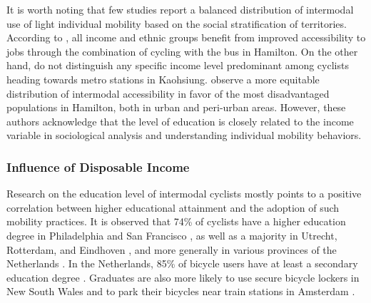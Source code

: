 \begin{refsegment}
It is worth noting that few studies report a balanced distribution of intermodal use of light individual mobility based on the social stratification of territories. According to \textcolor{blue}{\textcite[10]{zuo_first-and-last_2020}}, all income and ethnic groups benefit from improved accessibility to jobs through the combination of cycling with the bus in Hamilton. On the other hand, \textcolor{blue}{\textcite[1696]{cheng_evaluating_2012}} do not distinguish any specific income level predominant among cyclists heading towards metro stations in Kaohsiung. \textcolor{blue}{\textcite[86]{zuo_incorporating_2021}} observe a more equitable distribution of intermodal accessibility in favor of the most disadvantaged populations in Hamilton, both in urban and peri-urban areas. However, these authors acknowledge that the level of education is closely related to the income variable in sociological analysis and understanding individual mobility behaviors.%

\subsubsection*{Influence of Disposable Income
    \label{chap2:revenus}
    }

Research on the education level of intermodal cyclists mostly points to a positive correlation between higher educational attainment and the adoption of such mobility practices. It is observed that 74\% of cyclists have a higher education degree in Philadelphia and San Francisco \textcolor{blue}{\autocite[103]{flamm_public_2014}}, as well as a majority in Utrecht, Rotterdam, and Eindhoven \textcolor{blue}{\autocite[11]{jonkeren_bicycle-train_2021}}, and more generally in various provinces of the Netherlands \textcolor{blue}{\autocite[113]{heinen_multimodal_2014}}. In the Netherlands, 85\% of bicycle users have at least a secondary education degree \textcolor{blue}{\autocite[15]{shelat_analysing_2018}}. Graduates are also more likely to use secure bicycle lockers in New South Wales \textcolor{blue}{\autocite[18]{arbis_analysis_2016}}
 and to park their bicycles near train stations in Amsterdam \textcolor{blue}{\autocite[344]{kampen_bicycle_2021}}.%


\end{refsegment}
